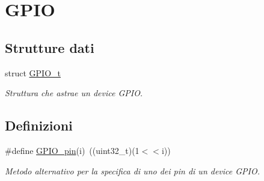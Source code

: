 \hypertarget{group___g_p_i_o}{\section{G\+P\+I\+O}
\label{group___g_p_i_o}
}
\subsection*{Strutture dati}
\begin{DoxyCompactItemize}
\item 
struct \hyperlink{struct_g_p_i_o__t}{G\+P\+I\+O\+\_\+t}
\begin{DoxyCompactList}\small\item\em Struttura che astrae un device G\+P\+I\+O. \end{DoxyCompactList}\end{DoxyCompactItemize}
\subsection*{Definizioni}
\begin{DoxyCompactItemize}
\item 
\#define \hyperlink{group___g_p_i_o_ga8ac4b8e7e6313a8b139ef0e9f9781a0b}{G\+P\+I\+O\+\_\+pin}(i)~((uint32\+\_\+t)(1$<$$<$i))
\begin{DoxyCompactList}\small\item\em Metodo alternativo per la specifica di uno dei pin di un device G\+P\+I\+O. \end{DoxyCompactList}\end{DoxyCompactItemize}
